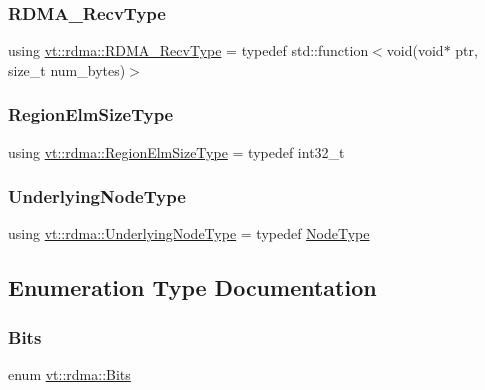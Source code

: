 \subsubsection{\texorpdfstring{R\+D\+M\+A\+\_\+\+Recv\+Type}{RDMA\_RecvType}}
{\footnotesize\ttfamily using \hyperlink{namespacevt_1_1rdma_aa07fa86d8eca8853254b40fc0e565726}{vt\+::rdma\+::\+R\+D\+M\+A\+\_\+\+Recv\+Type} = typedef std\+::function$<$void(void$\ast$ ptr, size\+\_\+t num\+\_\+bytes)$>$}

\mbox{\label{namespacevt_1_1rdma_ac07ef96e399913495fde1da0f83f684c}} 
\subsubsection{\texorpdfstring{Region\+Elm\+Size\+Type}{RegionElmSizeType}}
{\footnotesize\ttfamily using \hyperlink{namespacevt_1_1rdma_ac07ef96e399913495fde1da0f83f684c}{vt\+::rdma\+::\+Region\+Elm\+Size\+Type} = typedef int32\+\_\+t}

\mbox{\label{namespacevt_1_1rdma_a20d01bc82b95453c162d4b9857a4a78a}} 
\subsubsection{\texorpdfstring{Underlying\+Node\+Type}{UnderlyingNodeType}}
{\footnotesize\ttfamily using \hyperlink{namespacevt_1_1rdma_a20d01bc82b95453c162d4b9857a4a78a}{vt\+::rdma\+::\+Underlying\+Node\+Type} = typedef \hyperlink{namespacevt_a866da9d0efc19c0a1ce79e9e492f47e2}{Node\+Type}}



\subsection{Enumeration Type Documentation}
\mbox{\label{namespacevt_1_1rdma_a91e7211515508952960ca446ea609f65}} 
\subsubsection{\texorpdfstring{Bits}{Bits}}
{\footnotesize\ttfamily enum \hyperlink{namespacevt_1_1rdma_a91e7211515508952960ca446ea609f65}{vt\+::rdma\+::\+Bits}}

